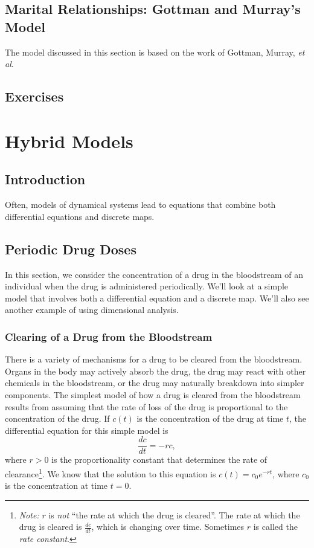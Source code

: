 \documentclass[reqno]{immbook}
\numberwithin{equation}{chapter}
\numberwithin{question}{section}
\numberwithin{theorem}{chapter}
\numberwithin{figure}{chapter}
\theoremstyle{definition}
\begin{document}
\section{Marital Relationships: Gottman and Murray's Model}
The model discussed in this section is based on the
work of Gottman, Murray, \emph{et al}\cite{GM}.
\section{Exercises}
%
%
%
\chapter{Hybrid Models}
\section{Introduction}
Often, models of dynamical systems lead to equations that combine
both differential equations and discrete maps.
\section{Periodic Drug Doses}

In this section, we consider the concentration of a drug
in the bloodstream of an individual when the drug is administered
periodically.  We'll look at a simple model that involves
both a differential equation and a discrete map.  We'll also
see another example of using dimensional analysis.

\subsection*{Clearing of a Drug from the Bloodstream}
There is a variety of mechanisms for a drug to be cleared from the
bloodstream. Organs in the body may actively absorb the drug, the drug
may react with other chemicals in the bloodstream,
or the drug may naturally breakdown
into simpler components.
The simplest model of how a drug is cleared from the bloodstream
results from assuming that the rate of loss of the drug is
proportional to the concentration of the drug. If $c(t)$ is the
concentration of the drug at time $t$, the differential equation
for this simple model is
\begin{equation}
  \frac{dc}{dt} = -r c,
\label{eqn:decay}
\end{equation}
where $r>0$ is the proportionality constant that determines
the rate of clearance\footnote{\emph{Note:} $r$
is \emph{not} ``the rate at which the drug is cleared''.
The rate at which the drug is cleared is $\frac{dc}{dt}$, which
is changing over time.  Sometimes $r$ is called the
\emph{rate constant}.}.
We know that the solution to this equation
is $c(t) = c_0 e^{-rt}$, where $c_0$ is the concentration
at time $t=0$.
\end{document}
